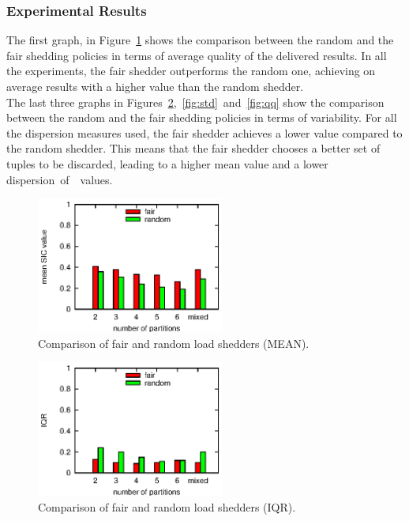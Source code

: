\subsubsection*{Experimental Results} 
The first graph, in Figure~\ref{fig:mean} shows the comparison
between the random and the fair shedding policies in terms of average quality of the delivered results.
In all the experiments, the fair shedder outperforms the random one, achieving on average results
with a higher \sic value than the random shedder. \\
The last three graphs in Figures~\ref{fig:iqr},~\ref{fig:std}~and~\ref{fig:qq} show the comparison
between the random and the fair shedding policies in terms of variability. For all the dispersion
measures used, the fair shedder achieves a lower value compared to the random shedder. This means that
the fair shedder chooses a better set of tuples to be discarded, leading to a higher mean \sic value
and a lower dispersion~of~\sic~values. 
\vspace{-10pt}
\begin{figure}[b]
\centering
\includegraphics[width=0.55\textwidth]{img/tesi/mean}
\caption{Comparison of fair and random load shedders (MEAN).}
\label{fig:mean}
\end{figure}
\clearpage
\begin{figure}[h]
\centering
\includegraphics[width=0.55\textwidth]{img/tesi/iqr}
\caption{Comparison of fair and random load shedders (IQR).}
\label{fig:iqr}
\end{figure}
